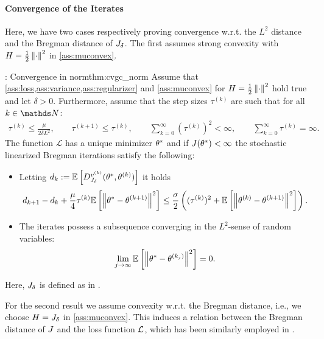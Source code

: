 \paragraph{Convergence of the Iterates}
Here, we have two cases respectively proving convergence w.r.t. the $L^2$ distance and the Bregman distance of $J_\delta$. The first assumes strong convexity with $H=\frac{1}{2}\left\|\cdot\right\|^2$ in \cref{ass:muconvex}.
%
%
\begin{theorem}{\cite[Thm. 6]{bungert2022bregman}: Convergence in norm}{thm:cvgc_norm}
Assume that \cref{ass:loss,ass:variance,ass:regularizer} and \cref{ass:muconvex} for $H=\frac{1}{2}\left\|\cdot\right\|^2$ hold true and let $\delta>0$.
Furthermore, assume that the step sizes $\tau^{(k)}$ are such that for all $k\in\N$:
\begin{align*}
    {\tau^{(k)}\leq \frac{\mu}{2\delta L^2}},\qquad
    \tau^{(k+1)} \leq \tau^{(k)}, \qquad
    \sum_{k=0}^\infty (\tau^{(k)})^2 < \infty, \qquad
    \sum_{k=0}^\infty \tau^{(k)} = \infty.
\end{align*}
The function $\mathcal{L}$ has a unique minimizer $\theta^*$ and if $J(\theta^*)<\infty$ the stochastic linearized Bregman iterations  satisfy the following:
\begin{itemize}
    \item Letting $d_k:=\mathbb{E}\left[D_{J_\delta}^{v^{(k)}}(\theta^*,\theta^{(k)})\right]$ it holds
    \begin{align}\label{ineq:decay_bregman_distance}
        d_{k+1} - d_k + \frac{\mu}{4}\tau^{(k)}\mathbb{E}\left[\left\|\theta^*-\theta^{(k+1)}\right\|^2\right]
        \leq  \frac{\sigma}{2}\left((\tau^{(k)})^2 +\mathbb{E}\left[\left\|\theta^{(k)} - \theta^{(k+1)}\right\|^2\right]\right).
    \end{align}
    \item The iterates possess a subsequence converging in the $L^2$-sense of random variables: 
    \begin{align}
        \lim_{j\to\infty}\mathbb{E}\left[\left\|\theta^*-\theta^{(k_j)}\right\|^2\right] = 0.
    \end{align}
\end{itemize}
{Here, $J_\delta$ is defined as in .}
\end{theorem}
%
%
\noindent%
For the second result we assume convexity w.r.t. the Bregman distance, i.e., we choose $H=J_{\delta}$ in \cref{ass:muconvex}. This induces a relation between the Bregman distance of $J$ and the loss function $\mathcal{L}$, which has been similarly employed in \cite{dragomir2021fast}.
